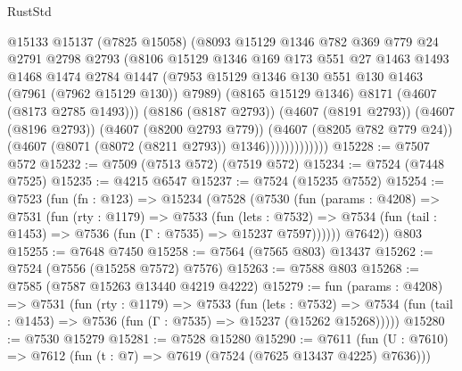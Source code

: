 \begin{lexlean}{RustStd}
\begin{coremodule}
                        @15133
                        @15137
                        (@7825 @15058)
                        (@8093
                          @15129
                          @1346
                          @782
                          @369
                          @779
                          @24
                          @2791
                          @2798
                          @2793
                          (@8106
                            @15129
                            @1346
                            @169
                            @173
                            @551
                            @27
                            @1463
                            @1493
                            @1468
                            @1474
                            @2784
                            @1447
                            (@7953
                              @15129
                              @1346
                              @130
                              @551
                              @130
                              @1463
                              (@7961 (@7962 @15129 @130))
                              @7989)
                            (@8165 @15129 @1346)
                            @8171
                            (@4607 (@8173 @2785 @1493)))
                          (@8186 (@8187 @2793))
                          (@4607 (@8191 @2793))
                          (@4607 (@8196 @2793))
                          (@4607 (@8200 @2793 @779))
                          (@4607 (@8205 @782 @779 @24))
                          (@4607 (@8071 (@8072 (@8211 @2793)) @1346)))))))))))))
@15228 := @7507 @572
@15232 := @7509 (@7513 @572) (@7519 @572)
@15234 := @7524 (@7448 @7525)
@15235 := @4215 @6547
@15237 := @7524 (@15235 @7552)
@15254 := @7523
    (fun (fn : @123) =>
    @15234
      (@7528
        (@7530
          (fun (params : @4208) =>
          @7531
            (fun (rty : @1179) =>
            @7533
              (fun (lets : @7532) =>
              @7534 (fun (tail : @1453) => @7536 (fun (Γ : @7535) => @15237 @7597))))))
        @7642))
    @803
@15255 := @7648 @7450
@15258 := @7564 (@7565 @803) @13437
@15262 := @7524 (@7556 (@15258 @7572) @7576)
@15263 := @7588 @803
@15268 := @7585 (@7587 @15263 @13440 @4219 @4222)
@15279 := fun (params : @4208) =>
  @7531
    (fun (rty : @1179) =>
    @7533
      (fun (lets : @7532) =>
      @7534 (fun (tail : @1453) => @7536 (fun (Γ : @7535) => @15237 (@15262 @15268)))))
@15280 := @7530 @15279
@15281 := @7528 @15280
@15290 := @7611
    (fun (U : @7610) => @7612 (fun (t : @7) => @7619 (@7524 (@7625 @13437 @4225) @7636)))

\end{coremodule}
\end{lexlean}
